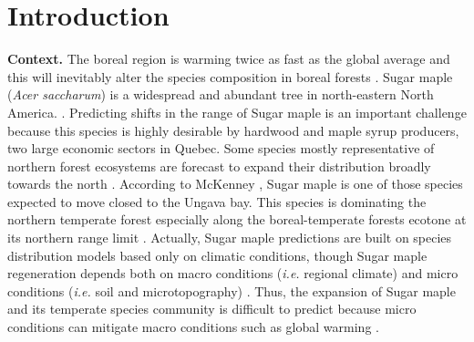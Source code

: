 


\newpage
\setcounter{page}{1}

\section{Introduction}

\textbf{Context.}  The boreal region is warming twice as fast as the global
average and  this will inevitably alter the species composition in boreal
forests \cite{Scheffer2012,Hughes2000,Lafleur2010}. Sugar maple (\textit{Acer
saccharum}) is a widespread and abundant tree in north-eastern North America.
\cite{Graignic2013,Messaoud2007,Kellman2004,Barras1998}. Predicting shifts in
the range of Sugar maple is an important challenge because this species is
highly desirable by hardwood and maple syrup producers, two large economic
sectors in Quebec. Some species mostly representative of northern forest
ecosystems are forecast to expand their distribution broadly towards the north
\cite{Sciences2014,Iverson2002}. According to McKenney \cite{Sciences2014}, Sugar 
maple is one of those species expected to move closed to the Ungava bay. 
This species is dominating the northern temperate forest
especially along the boreal-temperate forests ecotone at its northern range
limit \cite{Barras1998}. Actually, Sugar maple predictions are built on
species distribution models based only on climatic conditions, though Sugar
maple regeneration depends both on macro conditions (\textit{i.e.} regional
climate) and micro conditions (\textit{i.e.} soil and microtopography)
\cite{Graignic2013,Lafleur2010}. Thus, the expansion of Sugar maple and its
temperate species community is difficult to predict because micro conditions
can mitigate macro conditions such as global warming \cite{DeFrenne2013}.\\

